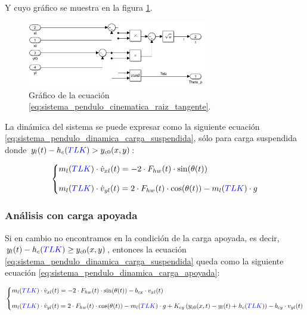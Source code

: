 \documentclass[11pt]{article}
\begin{document}
Y cuyo gráfico se muestra en la figura \ref{fig:sistema_pendulo_cinematica_raiz_tangente}.

\begin{figure}[h!]
	\centering
	\includegraphics[width=0.7\textwidth]{images/imagen_8_sistema_pendulo_cinematica_raiz_tangente.png}
	\caption{Gráfico de la ecuación \ref{eq:sistema_pendulo_cinematica_raiz_tangente}.}
	\label{fig:sistema_pendulo_cinematica_raiz_tangente}
\end{figure}

\newpage

La dinámica del sistema se puede expresar como la siguiente ecuación \ref{eq:sistema_pendulo_dinamica_carga_suspendida}, sólo para carga suspendida donde $y_{l}(t)-h_{c}({\color{blue}TLK})>y_{c0}(x,y)$:

\begin{equation}
	\label{eq:sistema_pendulo_dinamica_carga_suspendida}
	\left\{
		\begin{matrix*}[l]
		m_{l}({\color{blue}TLK})\cdot \dot{v}_{xl}(t)= -2 \cdot F_{hw}(t)\cdot \sin(\theta(t))
		\\
		\\ 
		m_{l}({\color{blue}TLK})\cdot \dot{v}_{yl}(t)=2 \cdot F_{hw}(t)\cdot \cos(\theta(t))-m_{l}({\color{blue}TLK})\cdot g
		\end{matrix*}
	\right.
\end{equation}

\subsubsection{Análisis con carga apoyada}

Si en cambio no encontramos en la condición de la carga apoyada, es decir, $y_{l}(t)-h_{c}({\color{blue}TLK})\geq y_{c0}(x,y)$, entonces la ecuación \ref{eq:sistema_pendulo_dinamica_carga_suspendida} queda como la siguiente ecuación \ref{eq:sistema_pendulo_dinamica_carga_apoyada}:

\begin{equation}
	\label{eq:sistema_pendulo_dinamica_carga_apoyada}
	\left\{
		\begin{matrix*}[l]
		m_{l}({\color{blue}TLK})\cdot \dot{v}_{xl}(t)= -2 \cdot F_{hw}(t)\cdot \sin(\theta(t))-b_{cx}\cdot v_{xl}(t)
		\\
		\\ 
		m_{l}({\color{blue}TLK})\cdot \dot{v}_{yl}(t)=2 \cdot F_{hw}(t)\cdot \cos(\theta(t))-m_{l}({\color{blue}TLK})\cdot g + K_{cy} \left ( y_{c0}(x,t)-y_{l}(t)+h_{c}({\color{blue}TLK}) \right )-b_{cy}\cdot v_{yl}(t)
		\end{matrix*}
	\right.
\end{equation}
\end{document}
